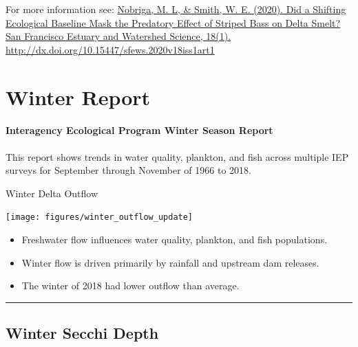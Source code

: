 \documentclass[
]{book}
\providecommand{\tightlist}{%
  \setlength{\itemsep}{0pt}\setlength{\parskip}{0pt}}
\begin{document}
\begin{disclaimer}
For more information see:
\href{http://dx.doi.org/10.15447/sfews.2020v18iss1art1}{Nobriga, M. L,
\& Smith, W. E. (2020). Did a Shifting Ecological Baseline Mask the
Predatory Effect of Striped Bass on Delta Smelt? San Francisco Estuary
and Watershed Science, 18(1).}
\url{http://dx.doi.org/10.15447/sfews.2020v18iss1art1}
\end{disclaimer}

\hypertarget{Winter}{%
\chapter{Winter Report}\label{Winter}}

\hypertarget{interagency-ecological-program-winter-season-report}{%
\subsubsection{Interagency Ecological Program Winter Season Report}\label{interagency-ecological-program-winter-season-report}}

This report shows trends in water quality, plankton, and fish across multiple IEP
surveys for September through November of 1966 to 2018.

Winter Delta Outflow

\texttt{[image: figures/winter\_outflow\_update]}

\begin{itemize}
\tightlist
\item
  Freshwater flow influences water quality, plankton, and fish populations.
\item
  Winter flow is driven primarily by rainfall and upstream dam releases.
\item
  The winter of 2018 had lower outflow than average.
\end{itemize}

\begin{center}\rule{0.5\linewidth}{0.5pt}\end{center}

\hypertarget{winter-secchi-depth}{%
\section{Winter Secchi Depth}\label{winter-secchi-depth}}
\end{document}
